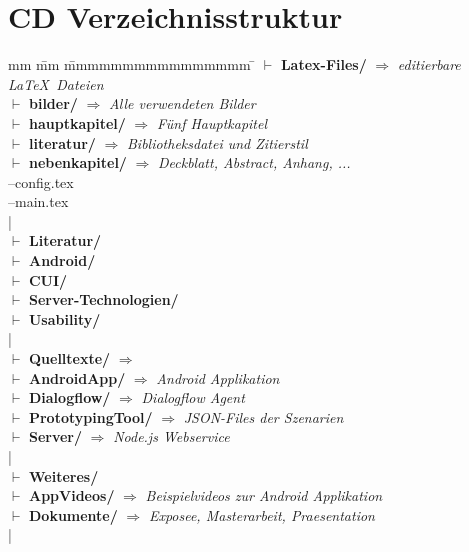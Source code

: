 \section{CD Verzeichnisstruktur}
\label{sec:cd-verzeichnisstruktur}
\begin{tabbing}
	mm \= mm \= mmmmmmmmmmmmmmmm \= \kill
    $\vdash$ \textbf{Latex-Files/} $\Rightarrow$ \textit{editierbare \LaTeX~Dateien}\\ %
	\> \>  $\vdash$  \textbf{bilder/}   	\> $\Rightarrow$ \textit{Alle verwendeten Bilder}\\
	\> \>  $\vdash$  \textbf{hauptkapitel/}  \> $\Rightarrow$ \textit{Fünf Hauptkapitel}\\
	\> \>  $\vdash$  \textbf{literatur/}   \> $\Rightarrow$ \textit{Bibliotheksdatei und Zitierstil}\\
	\> \>  $\vdash$  \textbf{nebenkapitel/}   \> $\Rightarrow$ \textit{Deckblatt, Abstract, Anhang, ...}\\
	\> \> --config.tex\\
	\> \> --main.tex\\
	|\\
	$\vdash$ \textbf{Literatur/} \\ 
	\> \>  $\vdash$  \textbf{Android/} \\
	\> \>  $\vdash$  \textbf{CUI/} \\ 
	\> \>  $\vdash$  \textbf{Server-Technologien/} \\ 
	\> \>  $\vdash$  \textbf{Usability/} \\ 
	|\\
	$\vdash$ \textbf{Quelltexte/} $\Rightarrow$\\ %
	\> \>  $\vdash$  \textbf{AndroidApp/}   	\> $\Rightarrow$ \textit{Android Applikation}\\
	\> \>  $\vdash$  \textbf{Dialogflow/}   	\> $\Rightarrow$ \textit{Dialogflow Agent}\\
	\> \>  $\vdash$  \textbf{PrototypingTool/}   	\> $\Rightarrow$ \textit{\ac{JSON}-Files der Szenarien}\\
	\> \>  $\vdash$  \textbf{Server/}   	\> $\Rightarrow$ \textit{Node.js Webservice}\\
    |\\
    $\vdash$ \textbf{Weiteres/} \\
    \> \>  $\vdash$  \textbf{AppVideos/}   	\> $\Rightarrow$ \textit{Beispielvideos zur Android Applikation}\\
	\> \>  $\vdash$  \textbf{Dokumente/}   	\> $\Rightarrow$ \textit{Exposee, Masterarbeit, Praesentation}\\
	|\\
\end{tabbing}